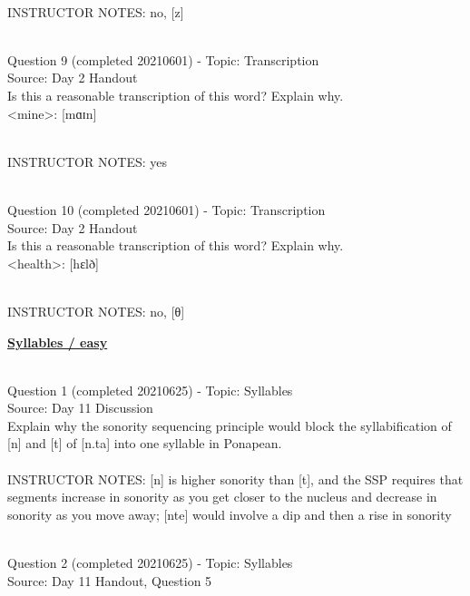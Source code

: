 \documentclass[12pt]{article}
\begin{document}
~\\
INSTRUCTOR NOTES: no, [z]


~\\

{\large Question 9} (completed 20210601) - Topic: Transcription\\
Source: Day 2 Handout\\

Is this a reasonable transcription of this word? Explain why.\\

<mine>: {[mɑɪn]}


~\\
INSTRUCTOR NOTES: yes


~\\

{\large Question 10} (completed 20210601) - Topic: Transcription\\
Source: Day 2 Handout\\

Is this a reasonable transcription of this word? Explain why.\\

<health>: {[hɛlð]}


~\\
INSTRUCTOR NOTES: no, [θ]


\newpage\textbf{\underline{\huge Syllables / easy\\}}

~\\

{\large Question 1} (completed 20210625) - Topic: Syllables\\
Source: Day 11 Discussion\\

Explain why the sonority sequencing principle would block the syllabification of [n] and [t] of [n.ta] into one syllable in Ponapean.\\


~\\
INSTRUCTOR NOTES: [n] is higher sonority than [t], and the SSP requires that segments increase in sonority as you get closer to the nucleus and decrease in sonority as you move away; [nte] would involve a dip and then a rise in sonority


~\\

{\large Question 2} (completed 20210625) - Topic: Syllables\\
Source: Day 11 Handout, Question 5\\
\end{document}

